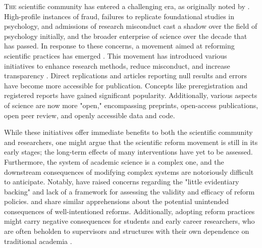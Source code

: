 \documentclass[authordate, editorial, noabstract, issue]{jote-new-article}
\author[1]{\mbox{Sarahanne Field\orcid{0000-0001-7874-1261}}}
\affil[1]{University of Groningen}
\author[2]{\mbox{Noah van Dongen\orcid{0000-0003-0387-7388}}}
\affil[2]{University of Amsterdam}
\author[3]{\mbox{Leo Tiokhin\orcid{0000-0001-7333-0383}}}
\affil[3]{IG\&H: Utrecht}
\begin{document}
\begin{frontmatter}
  \maketitle
  \begin{abstract}
    \printabstracttext
  \end{abstract}
\end{frontmatter}












\noindent \lettrine{T}{he} scientific community has entered a challenging era, as originally noted by \textcite{Wagenmakers2012}. High-profile instances of fraud, failures to replicate foundational studies in psychology, and admissions of research misconduct \parencites[e.g.,][]{John2012} cast a shadow over the field of psychology initially, and the broader enterprise of science over the decade that has passed. In response to these concerns, a movement aimed at reforming scientific practices has emerged \parencites{Field2022}{Munafo2017}{Spellman2018}. This movement has introduced various initiatives to enhance research methods, reduce misconduct, and increase transparency \parencites[see][for an overview]{van2023perspectives}. Direct replications and articles reporting null results and errors \parencites[such as the\emph{ Journal of Trial and Error}; see][]{Devine_2020} have become more accessible for publication. Concepts like preregistration and registered reports have gained significant popularity. Additionally, various aspects of science are now more "open," encompassing preprints, open-access publications, open peer review, and openly accessible data and code.



While these initiatives offer immediate benefits to both the scientific community and researchers, one might argue that the scientific reform movement is still in its early stages; the long-term effects of many interventions have yet to be assessed. Furthermore, the system of academic science is a complex one, and the downstream consequences of modifying complex systems are notoriously difficult to anticipate. Notably, \textcite[][, p. 2]{Devezer2020} have raised concerns regarding the "little evidentiary backing" and lack of a framework for assessing the validity and efficacy of reform policies. \textcite{Ioannidis2014} and \textcite{Tiokhin2021} share similar apprehensions about the potential unintended consequences of well-intentioned reforms. Additionally, adopting reform practices might carry negative consequences for students and early career researchers, who are often beholden to supervisors and structures with their own dependence on traditional academia \parencites{Field2023}.
\end{document}
